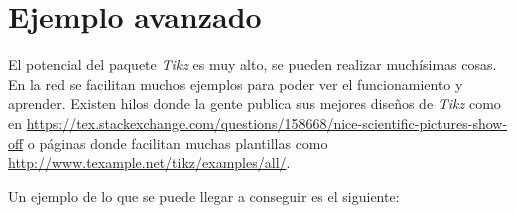 \section{Ejemplo avanzado}

El potencial del paquete \textit{Tikz} es muy alto, se pueden realizar muchísimas cosas. En la red se facilitan muchos ejemplos para poder ver el funcionamiento y aprender. Existen hilos donde la gente publica sus mejores diseños de \textit{Tikz} como en \url{https://tex.stackexchange.com/questions/158668/nice-scientific-pictures-show-off} o páginas donde facilitan muchas plantillas como \url{http://www.texample.net/tikz/examples/all/}.
\par Un ejemplo de lo que se puede llegar a conseguir es el siguiente:

